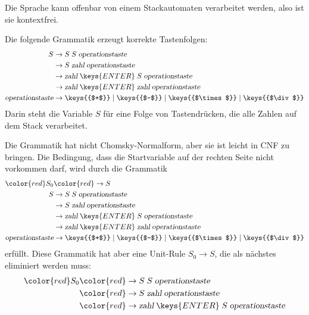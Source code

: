 \begin{loesung}
\begin{teilaufgaben}
\item Die Sprache kann offenbar von einem Stackautomaten verarbeitet werden,
also ist sie kontextfrei.
\item Die folgende Grammatik erzeugt korrekte Tastenfolgen:
\begin{align*}
S&\rightarrow S \; S \; \textsl{operationstaste}
\\
 &\rightarrow S \; \textsl{zahl} \; \textsl{operationstaste}
\\
 &\rightarrow \textsl{zahl}\;\keys{ENTER}\; S\;\textsl{operationstaste}
\\
 &\rightarrow \textsl{zahl}\;\keys{ENTER}\; \textsl{zahl}\;\textsl{operationstaste}
\\
\textsl{operationstaste}&\rightarrow
\keys{{$+$}}
\;|\;
\keys{{$-$}}
\;|\;
\keys{{$\times$}}
\;|\;
\keys{{$\div$}}
\\
\end{align*}
Darin steht die Variable $S$ für eine Folge von Tastendrücken, die
alle Zahlen auf dem Stack verarbeitet.
\item
Die Grammatik hat nicht Chomsky-Normalform, aber sie ist leicht in
CNF zu bringen. Die Bedingung, dass die Startvariable auf der rechten
Seite nicht vorkommen darf, wird durch die Grammatik
\begin{align*}
\color{red}S_0&\color{red}\rightarrow S
\\
S&\rightarrow S \; S \; \textsl{operationstaste}
\\
 &\rightarrow S \; \textsl{zahl} \; \textsl{operationstaste}
\\
 &\rightarrow \textsl{zahl}\;\keys{ENTER}\; S\;\textsl{operationstaste}
\\
 &\rightarrow \textsl{zahl}\;\keys{ENTER}\; \textsl{zahl}\;\textsl{operationstaste}
\\
\textsl{operationstaste}&\rightarrow
\keys{{$+$}}
\;|\;
\keys{{$-$}}
\;|\;
\keys{{$\times$}}
\;|\;
\keys{{$\div$}}
\end{align*}
erfüllt. Diese Grammatik hat aber eine Unit-Rule $S_0\to S$, die als nächstes
eliminiert werden muss:
\begin{align*}
\color{red}S_0&\color{red}\rightarrow S \; S \; \textsl{operationstaste}
\\
 &\color{red}\rightarrow S \; \textsl{zahl} \; \textsl{operationstaste}
\\
 &\color{red}\rightarrow \textsl{zahl}\;\keys{ENTER}\; S\;\textsl{operationstaste}

\end{align*}
\end{teilaufgaben}
\end{loesung}
